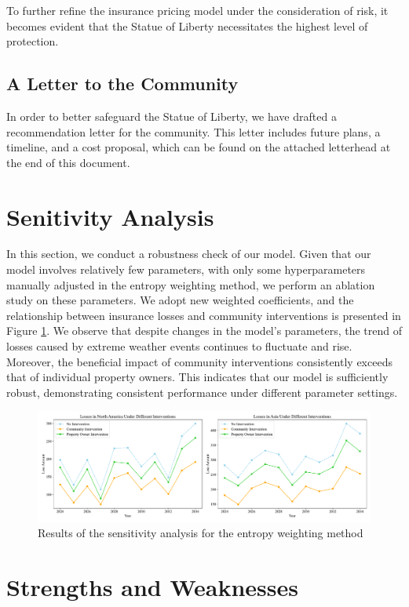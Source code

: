 \documentclass[12pt]{article}
\begin{document}
To further refine the insurance pricing model under the consideration of risk, it becomes evident that the Statue of Liberty necessitates the highest level of protection.

\subsection{A Letter to the Community}
In order to better safeguard the Statue of Liberty, we have drafted a recommendation letter for the community. This letter includes future plans, a timeline, and a cost proposal, which can be found on the attached letterhead at the end of this document.


\section{Senitivity Analysis}\label{condition}
In this section, we conduct a robustness check of our model. Given that our model involves relatively few parameters, with only some hyperparameters manually adjusted in the entropy weighting method, we perform an ablation study on these parameters. We adopt new weighted coefficients, and the relationship between insurance losses and community interventions is presented in Figure \ref{fig:loss2}. We observe that despite changes in the model's parameters, the trend of losses caused by extreme weather events continues to fluctuate and rise. Moreover, the beneficial impact of community interventions consistently exceeds that of individual property owners. This indicates that our model is sufficiently robust, demonstrating consistent performance under different parameter settings.

\begin{figure}[htbp]
    \centering
    \includegraphics[width = 0.9\linewidth]{figure/loss2.pdf}
    \caption{Results of the sensitivity analysis for the entropy weighting method}
    \label{fig:loss2}
\end{figure}



\section{ Strengths and Weaknesses}
\end{document}

